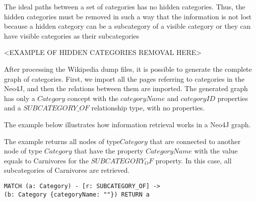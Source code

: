 The ideal paths between a set of categories has no hidden categories. Thus, the hidden categories must be removed in such a way that the information is not lost because a hidden category can be a subcategory of a visible category or they can have visible categories as their subcategories

<EXAMPLE OF HIDDEN CATEGORIES REMOVAL HERE>

After processing the Wikipedia dump files,  it is possible to generate the complete graph of categories. First, we import all the pages referring to categories in the Neo4J, and then the relations between them are imported. The generated graph has only a $Category$ concept with the $categoryName$ and $categoryID$ properties and a $SUBCATEGORY\_OF$ relationship type, with no properties.

The example below illustrates how information retrieval works in a Neo4J graph.

The example returns all nodes of type$ Category$  that are connected to another node of type $Category$ that have the property $CategoryName$ with the value equals to Carnivores for the $SUBCATEGORY_OF$ property. In this case, all subcategories of Carnivores are retrieved.

\begin{verbatim}
MATCH (a: Category) - [r: SUBCATEGORY_OF] ->
(b: Category {categoryName: ""}) RETURN a
\end{verbatim}





